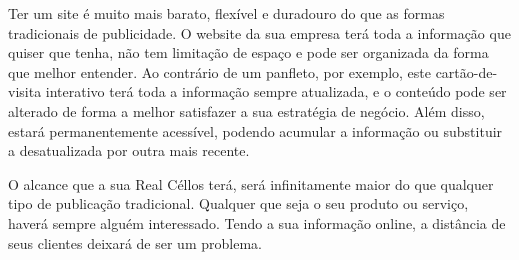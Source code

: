 \documentclass[
	12pt,				%
    oneside,			%
	a4paper,			%
	english,			%
	french,				%
	spanish,			%
	brazil,				%
	]{abntex2}
\begin{document}
Ter um site é muito mais barato, flexível e duradouro do que as formas tradicionais de publicidade.  O website da sua empresa terá toda a informação que quiser que tenha, não tem limitação de espaço e pode ser organizada da forma que melhor entender. Ao contrário de um panfleto, por exemplo, este cartão-de-visita interativo terá toda a informação sempre atualizada, e o conteúdo pode ser alterado de forma a melhor satisfazer a sua estratégia de negócio. Além disso, estará permanentemente acessível, podendo acumular a informação ou substituir a desatualizada por outra mais recente.

O alcance que a sua Real Céllos terá, será infinitamente maior do que qualquer tipo de publicação tradicional. Qualquer que seja o seu produto ou serviço, haverá sempre alguém interessado. Tendo a sua informação online, a distância de seus clientes deixará de ser um problema.



%
%


\end{document}

